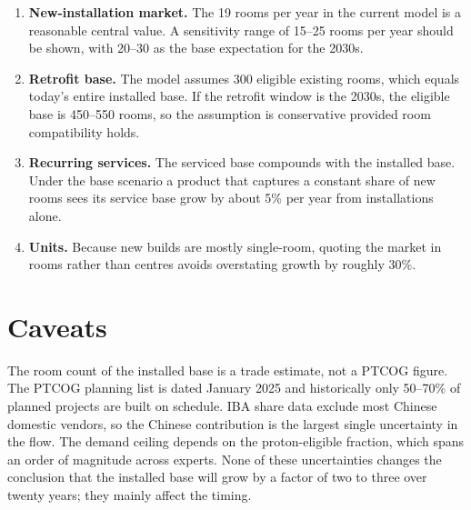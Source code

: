 \documentclass[11pt,a4paper]{article}
\begin{document}
\begin{enumerate}
\item \textbf{New-installation market.} The 19 rooms per year in the current
  model is a reasonable central value. A sensitivity range of 15--25 rooms per
  year should be shown, with 20--30 as the base expectation for the 2030s.
\item \textbf{Retrofit base.} The model assumes 300 eligible existing rooms,
  which equals today's entire installed base. If the retrofit window is the
  2030s, the eligible base is 450--550 rooms, so the assumption is conservative
  provided room compatibility holds.
\item \textbf{Recurring services.} The serviced base compounds with the
  installed base. Under the base scenario a product that captures a constant
  share of new rooms sees its service base grow by about 5\% per year from
  installations alone.
\item \textbf{Units.} Because new builds are mostly single-room, quoting the
  market in rooms rather than centres avoids overstating growth by roughly
  30\%.
\end{enumerate}

\section{Caveats}

The room count of the installed base is a trade estimate, not a PTCOG figure.
The PTCOG planning list is dated January 2025 and historically only 50--70\% of
planned projects are built on schedule. IBA share data exclude most Chinese
domestic vendors, so the Chinese contribution is the largest single uncertainty
in the flow. The demand ceiling depends on the proton-eligible fraction, which
spans an order of magnitude across experts. None of these uncertainties
changes the conclusion that the installed base will grow by a factor of two to
three over twenty years; they mainly affect the timing.
\end{document}
